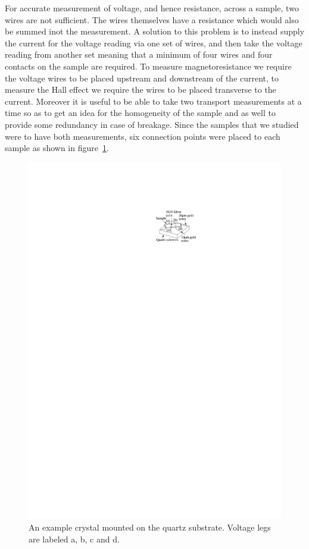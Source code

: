 For accurate measurement of voltage, and hence resistance, across a sample, two wires are not sufficient. The wires themselves have a resistance which would also be summed inot the measurement. A solution to this problem is to instead supply the current for the voltage reading via one set of wires, and then take the voltage reading from another set meaning that a minimum of four wires and four contacts on the sample are required. To measure magnetoresistance we require the voltage wires to be placed upstream and downstream of the current, to measure the Hall effect we require the wires to be placed transverse to the current. Moreover it is useful to be able to take two transport measurements at a time so as to get an idea for the homogeneity of the sample and as well to provide some redundancy in case of breakage. Since the \BSCO samples that we studied were to have both measurements, six connection points were placed to each sample as shown in figure~\ref{Fig:Exp:BSCOSampleSchematic}.
\begin{figure}[htbp]
    \begin{center}
        \includegraphics[scale=0.9]{Chapter-ExperimentalTechnique/Figures/BSCOSampleSchematic/BSCOSampleSchematic}
        \caption{An example \BSCO crystal mounted on the quartz substrate. Voltage legs are labeled a, b, c and d.}
        \label{Fig:Exp:BSCOSampleSchematic}
    \end{center}
\end{figure}
